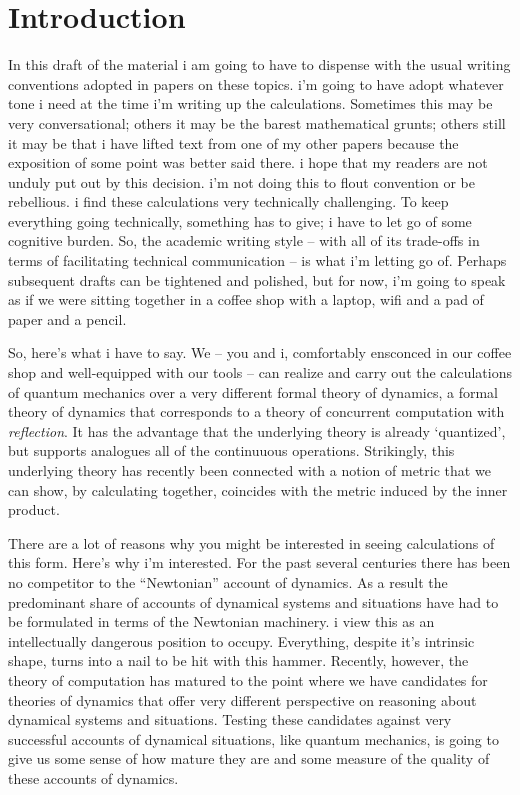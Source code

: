 \section{Introduction}\label{sec:introduction} %
In this draft of the material i am going to have to dispense with the
usual writing conventions adopted in papers on these topics. i'm going
to have adopt whatever tone i need at the time i'm writing up the
calculations. Sometimes this may be very conversational; others it may
be the barest mathematical grunts; others still it may be that i have
lifted text from one of my other papers because the exposition of some
point was better said there. i hope that my readers are not unduly put
out by this decision. i'm not doing this to flout convention or be
rebellious. i find these calculations very technically challenging. To
keep everything going technically, something has to give; i have to
let go of some cognitive burden. So, the academic writing style --
with all of its trade-offs in terms of facilitating technical
communication -- is what i'm letting go of. Perhaps subsequent drafts
can be tightened and polished, but for now, i'm going to speak as if
we were sitting together in a coffee shop with a laptop, wifi and a
pad of paper and a pencil.

So, here's what i have to say. We -- you and i, comfortably ensconced
in our coffee shop and well-equipped with our tools -- can realize and
carry out the calculations of quantum mechanics over a very different
formal theory of dynamics, a formal theory of dynamics that
corresponds to a theory of concurrent computation with
\emph{reflection}. It has the advantage that the underlying theory is
already `quantized', but supports analogues all of the continuuous
operations. Strikingly, this underlying theory has recently been
connected with a notion of metric that we can show, by calculating
together, coincides with the metric induced by the inner product.

There are a lot of reasons why you might be interested in seeing
calculations of this form. Here's why i'm interested. For the past
several centuries there has been no competitor to the ``Newtonian''
account of dynamics. As a result the predominant share of accounts of
dynamical systems and situations have had to be formulated in terms of
the Newtonian machinery. i view this as an intellectually dangerous
position to occupy. Everything, despite it's intrinsic shape, turns
into a nail to be hit with this hammer. Recently, however, the theory
of computation has matured to the point where we have candidates for
theories of dynamics that offer very different perspective on
reasoning about dynamical systems and situations. Testing these
candidates against very successful accounts of dynamical situations,
like quantum mechanics, is going to give us some sense of how mature
they are and some measure of the quality of these accounts of
dynamics.


